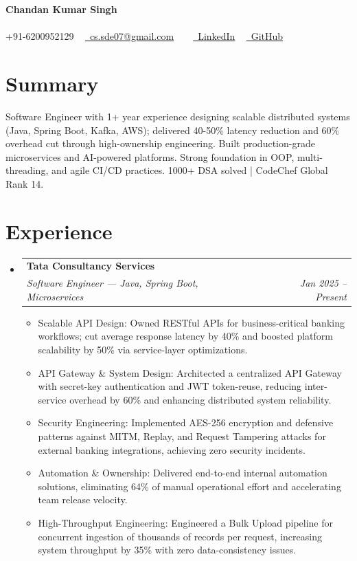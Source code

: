 \documentclass[10pt, letterpaper]{article}
\makeatletter
\newcommand{\resumeItem}[1]{
  \item\small{
    {#1 \vspace{-2pt}}
  }
}
\newcommand{\resumeSubheading}[4]{
  \vspace{-2pt}\item
    \begin{tabular*}{1.0\textwidth}[t]{l@{\extracolsep{\fill}}r}
      \textbf{#1} & \textbf{\small #2} \\
      \textit{\small#3} & \textit{\small #4} \\
    \end{tabular*}\vspace{-7pt}
}
\newcommand{\resumeSubHeadingListStart}{\begin{itemize}[leftmargin=0.0in, label={}]}
\newcommand{\resumeSubHeadingListEnd}{\end{itemize}}
\newcommand{\resumeItemListStart}{\begin{itemize}[leftmargin=0.15in]}
\newcommand{\resumeItemListEnd}{\end{itemize}\vspace{-5pt}}
\makeatother
\begin{document}
\begin{center}
    {\Huge \bfseries Chandan Kumar Singh} \\ \vspace{5pt}
    ~ \\ \vspace{5pt}
    \small \faPhone* +91-6200952129 ~ 
    \href{mailto:cs.sde07@gmail.com}{\faEnvelope~cs.sde07@gmail.com} ~ 
     ~ \href{LinkedIn}{\faLinkedin~LinkedIn}
     ~ \href{GitHub}{\faGithub~GitHub}
    
\end{center}

\section{Summary}
Software Engineer with 1+ year experience designing scalable distributed systems (Java, Spring Boot, Kafka, AWS); delivered 40-50\% latency reduction and 60\% overhead cut through high-ownership engineering. Built production-grade microservices and AI-powered platforms. Strong foundation in OOP, multi-threading, and agile CI/CD practices. 1000+ DSA solved | CodeChef Global Rank 14.


\section{Experience}
\resumeSubHeadingListStart
  \resumeSubheading{Tata Consultancy Services}{}{Software Engineer — Java, Spring Boot, Microservices}{Jan 2025 -- Present}
    \resumeItemListStart
      \resumeItem{Scalable API Design: Owned RESTful APIs for business-critical banking workflows; cut average response latency by 40\% and boosted platform scalability by 50\% via service-layer optimizations.}
      \resumeItem{API Gateway \& System Design: Architected a centralized API Gateway with secret-key authentication and JWT token-reuse, reducing inter-service overhead by 60\% and enhancing distributed system reliability.}
      \resumeItem{Security Engineering: Implemented AES-256 encryption and defensive patterns against MITM, Replay, and Request Tampering attacks for external banking integrations, achieving zero security incidents.}
      \resumeItem{Automation \& Ownership: Delivered end-to-end internal automation solutions, eliminating 64\% of manual operational effort and accelerating team release velocity.}
      \resumeItem{High-Throughput Engineering: Engineered a Bulk Upload pipeline for concurrent ingestion of thousands of records per request, increasing system throughput by 35\% with zero data-consistency issues.}
    \resumeItemListEnd
\resumeSubHeadingListEnd
\end{document}
